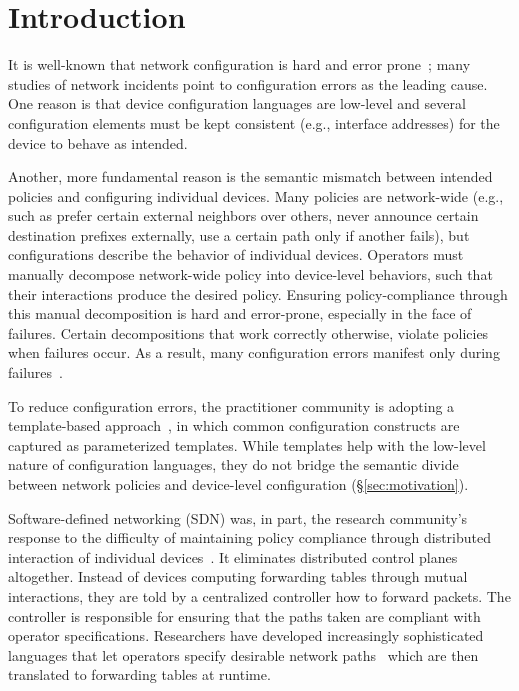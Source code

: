 \section{Introduction}
\label{sec:introduction}

It is well-known that network configuration is hard and error prone~\cite{x,y,z}; many studies of network incidents point to configuration errors as the leading cause.
%
One reason is that device configuration languages are low-level and several configuration elements must be kept consistent (e.g., interface addresses) for the device to behave as intended.
%

Another, more fundamental reason is the semantic mismatch between intended policies and configuring individual devices.
%
Many policies are network-wide (e.g., such as prefer certain external neighbors over others, never announce certain destination prefixes externally, use a certain path only if another fails), but configurations describe the behavior of individual devices.
%
Operators must manually decompose network-wide policy into device-level behaviors, such that their interactions produce the desired policy.
%
Ensuring policy-compliance through this manual decomposition is hard and error-prone, especially in the face of failures. Certain decompositions that work correctly otherwise, violate policies when failures occur.
%
As a result, many configuration errors manifest only during failures~\cite{batfish}.

To reduce configuration errors, the practitioner community is adopting a template-based approach~\cite{x,y}, in which common configuration constructs are captured as parameterized templates.
 While templates help with the low-level nature of configuration languages, they do not bridge the semantic divide between network policies and device-level configuration (\S\ref{sec:motivation}).

Software-defined networking (SDN) was, in part, the research community's response to the difficulty of maintaining policy compliance through distributed interaction of individual devices~\cite{xx}. It eliminates distributed control planes altogether. Instead of devices computing  forwarding tables through mutual interactions, they are told by a centralized controller how to forward packets. The controller is responsible for ensuring that the paths taken are compliant with operator specifications. Researchers have developed increasingly sophisticated languages that let operators specify desirable network paths~\cite{x,y,z} which are then translated to forwarding tables at runtime.

